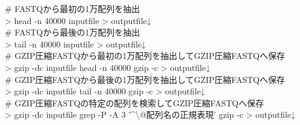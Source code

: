 \documentclass[titlepage,10pt,a4paper]{jsbook}
\newenvironment{cmd}{\begin{oframed}\raggedright\ttfamily\footnotesize\setlength{\baselineskip}{1.4em}}{\end{oframed}\vspace{-1em}}
\begin{document}
\begin{cmd}
\# FASTQから最初の1万配列を抽出\\
{\textgreater} head -n 40000 inputfile {\textgreater} outputfile↓\\
\# FASTQから最後の1万配列を抽出\\
{\textgreater} tail -n 40000 inputfile {\textgreater} outputfile↓\\
\# GZIP圧縮FASTQから最初の1万配列を抽出してGZIP圧縮FASTQへ保存\\
{\textgreater} gzip -dc inputfile {\textbar} head -n 40000 {\textbar} gzip -c {\textgreater} outputfile↓\\
\# GZIP圧縮FASTQから最後の1万配列を抽出してGZIP圧縮FASTQへ保存\\
{\textgreater} gzip -dc inputfile {\textbar} tail -n 40000 {\textbar} gzip -c {\textgreater} outputfile↓\\
\# GZIP圧縮FASTQの特定の配列を検索してGZIP圧縮FASTQへ保存\\
{\textgreater} gzip -dc inputfile {\textbar} grep -P -A 3 '{\textasciicircum}{\textbackslash}@配列名の正規表現' {\textbar} gzip -c {\textgreater} outputfile↓
\end{cmd}
\end{document}
